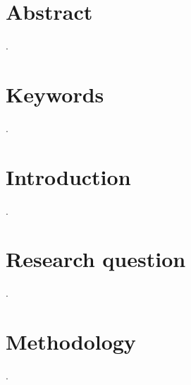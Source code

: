 \documentclass[12pt, a4paper]{article}
\begin{document}
\section*{Abstract} %
.

\section*{Keywords} %
.

\newpage
\tableofcontents
\newpage


\section{Introduction}
.

\section{Research question}
.

\section{Methodology}
.

\end{document}
